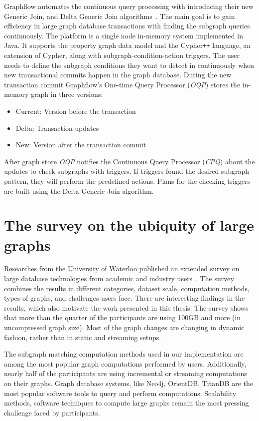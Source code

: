 Graphflow automates the continuous query processing with introducing their new Generic Join, and Delta Generic Join algorithms~\cite{DBLP:conf/sigmod/KankanamgeSMCS17}.
The main goal is to gain efficiency in large graph database transactions with finding the subgraph queries continuously.
The platform is a single node in-memory system implemented in Java.
It supports the property graph data model and the Cypher\texttt{++} language, an extension of Cypher, along with subgraph-condition-action triggers.
The user needs to define the subgraph conditions they want to detect in continuously when new transactional commits happen in the graph database.
During the new transaction commit Graphflow's One-time Query Processor (\textit{OQP}) stores the in-memory graph in three versions:
\begin{itemize}
    \item Current: Version before the transaction
    \item Delta: Transaction updates
    \item New: Version after the transaction commit
\end{itemize}
After graph store \textit{OQP} notifies the Continuous Query Processor (\textit{CPQ}) about the updates to check subgraphs with triggers.
If triggers found the desired subgraph pattern, they will perform the predefined actions.
Plans for the checking triggers are built using the Delta Generic Join algorithm.

\section{The survey on the ubiquity of large graphs}

Researches from the University of Waterloo published an extended survey on large database technologies from academic and industry users~\cite{DBLP:journals/pvldb/SahuMSLO17}. 
The survey combines the results in different categories, dataset scale, computation methods, types of graphs, and challenges users face.
There are interesting findings in the results, which also motivate the work presented in this thesis.
The survey shows that more than the quarter of the participants are using 100GB and more (in uncompressed graph size).
Most of the graph changes are changing in dynamic fashion, rather than in static and streaming setups.

The subgraph matching computation methods used in our implementation are among the most popular graph computations performed by users.
Additionally, nearly half of the participants are using incremental or streaming computations on their graphs.
Graph database systems, like Neo4j, OrientDB, TitanDB are the most popular software tools to query and perform computations.
Scalability methods, software techniques to compute large graphs remain the most pressing challenge faced by participants.

